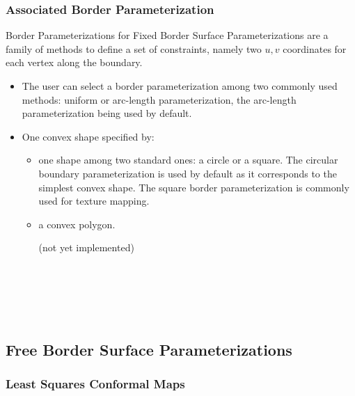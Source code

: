 \subsubsection{Associated Border Parameterization}

Border Parameterizations for Fixed Border Surface Parameterizations
are a family of methods to define a set of constraints, namely two
$u,v$ coordinates for each vertex along the boundary.

\begin{itemize}

\item The user can select a border parameterization among
two commonly used methods: uniform or arc-length parameterization, the
arc-length parameterization being used by default.

\item One convex shape specified by:

    \begin{itemize}

    \item one shape among two standard ones: a circle or a square.
    The circular boundary parameterization is used by default as it
    corresponds to the simplest convex shape. The square border
    parameterization is commonly used for texture mapping.

    \item a convex polygon.

    (not yet implemented)

    \end{itemize}

\end{itemize}

  \\
  \\
  \\
  \\


\subsection{Free Border Surface Parameterizations}

\subsubsection{Least Squares Conformal Maps}


